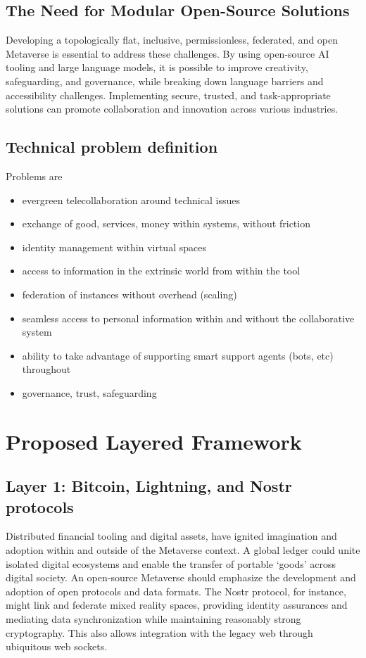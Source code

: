 \subsection{The Need for Modular Open-Source Solutions}
Developing a topologically flat, inclusive, permissionless, federated, and open Metaverse is essential to address these challenges. By using open-source AI tooling and large language models, it is possible to improve creativity, safeguarding, and governance, while breaking down language barriers and accessibility challenges. Implementing secure, trusted, and task-appropriate solutions can promote collaboration and innovation across various industries.

\subsection{Technical problem definition}
Problems are
\begin{itemize}
\item evergreen telecollaboration around technical issues
\item exchange of good, services, money within systems, without friction
\item identity management within virtual spaces
\item access to information in the extrinsic world from within the tool
\item federation of instances without overhead (scaling)
\item seamless access to personal information within and without the collaborative system
\item ability to take advantage of supporting smart support agents (bots, etc) throughout
\item governance, trust, safeguarding
\end{itemize}

\section{Proposed Layered Framework}
\subsection{Layer 1: Bitcoin, Lightning, and Nostr protocols}
Distributed financial tooling and digital assets, have ignited imagination and adoption within and outside of the Metaverse context. A global ledger could unite isolated digital ecosystems and enable the transfer of portable `goods' across digital society. An open-source Metaverse should emphasize the development and adoption of open protocols and data formats. The Nostr protocol, for instance, might link and federate mixed reality spaces, providing identity assurances and mediating data synchronization while maintaining reasonably strong cryptography. This also allows integration with the legacy web through ubiquitous web sockets.
